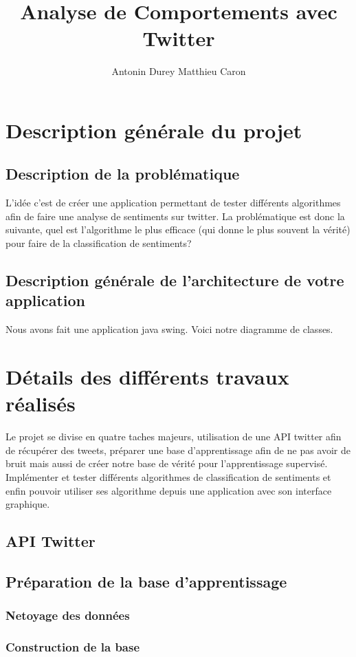 \documentclass[a4paper,10pt]{report}
\title{Analyse de Comportements avec Twitter}
\author{Antonin Durey Matthieu Caron}
\begin{document}
\maketitle

\chapter{Description générale du projet}
  \section{Description de la problématique}
    L'idée c'est de créer une application permettant de tester différents algorithmes
    afin de faire une analyse de sentiments sur twitter. La problématique est donc la suivante,
    quel est l'algorithme le plus efficace (qui donne le plus souvent la vérité) pour faire de la 
    classification de sentiments?
  \section{Description générale de l'architecture de votre application}
    Nous avons fait une application java swing. Voici notre diagramme de classes.
\chapter{Détails des différents travaux réalisés}
  Le projet se divise en quatre taches majeurs, utilisation de une API twitter afin de récupérer 
  des tweets, préparer une base d'apprentissage afin de ne pas avoir de bruit mais aussi de créer notre 
  base de vérité pour l'apprentissage supervisé. Implémenter et tester différents algorithmes de classification de sentiments et
  enfin pouvoir utiliser ses algorithme depuis une application avec son interface graphique.
  \section{API Twitter}
  \section{Préparation de la base d'apprentissage}
    \subsection{Netoyage des données}
    \subsection{Construction de la base}
\end{document}
